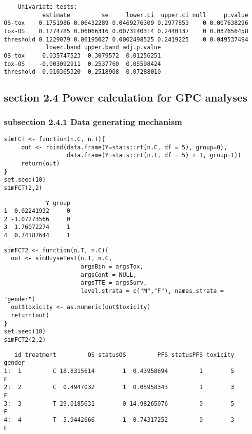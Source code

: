 \documentclass[12pt]{article}
\begin{document}
\begin{verbatim}
  - Univariate tests:
           estimate         se     lower.ci  upper.ci null     p.value
OS-tox    0.1751986 0.06432289 0.0469276309 0.2977853    0 0.007638296
tox-OS    0.1274785 0.06066316 0.0073140314 0.2440137    0 0.037656458
threshold 0.1229079 0.06195027 0.0002498525 0.2419225    0 0.049537494
            lower.band upper.band adj.p.value
OS-tox     0.035747523  0.3079572  0.01256251
tox-OS    -0.003092911  0.2537760  0.05598424
threshold -0.010365320  0.2518908  0.07288010
\end{verbatim}

\subsection{section 2.4 Power calculation for GPC analyses}
\label{sec:org9f08988}
\subsubsection{subsection 2.4.1 Data generating mechanism}
\label{sec:orgaf1f013}
\lstset{language=r,label= ,caption= ,captionpos=b,numbers=none}
\begin{lstlisting}
simFCT <- function(n.C, n.T){
     out <- rbind(data.frame(Y=stats::rt(n.C, df = 5), group=0),
                  data.frame(Y=stats::rt(n.T, df = 5) + 1, group=1))
     return(out)
}
set.seed(10)
simFCT(2,2)
\end{lstlisting}

\begin{verbatim}
            Y group
1  0.02241932     0
2 -1.07273566     0
3  1.76072274     1
4  0.74187644     1
\end{verbatim}



\lstset{language=r,label= ,caption= ,captionpos=b,numbers=none}
\begin{lstlisting}
simFCT2 <- function(n.T, n.C){
  out <- simBuyseTest(n.T, n.C,
                      argsBin = argsTox,
                      argsCont = NULL,
                      argsTTE = argsSurv,
                      level.strata = c("M","F"), names.strata = "gender")
  out$toxicity <- as.numeric(out$toxicity)
  return(out)
}
set.seed(10)
simFCT2(2,2) 
\end{lstlisting}

\begin{verbatim}
   id treatment         OS statusOS         PFS statusPFS toxicity gender
1:  1         C 18.8315614        1  0.43958694         1        5      F
2:  2         C  0.4947032        1  0.05958343         1        3      F
3:  3         T 29.0185631        0 14.98265076         0        5      F
4:  4         T  5.9442666        1  0.74317252         0        3      F
\end{verbatim}
\end{document}
